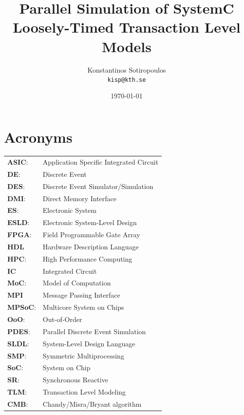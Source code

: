 \documentclass[12pt,twoside]{article}
\author{Konstantinos Sotiropoulos \\ \texttt{kisp@kth.se}}
\date{\today}
\title{Parallel Simulation of SystemC Loosely-Timed Transaction Level Models}
\begin{document}
\maketitle
\clearpage

\tableofcontents
\clearpage



\section{Acronyms}
\label{sec-1}
\begin{center}
\begin{tabular}{ll}
\textbf{ASIC}: & Application Specific Integrated Circuit\\
\textbf{DE}: & Discrete Event\\
\textbf{DES}: & Discrete Event Simulator/Simulation\\
\textbf{DMI}: & Direct Memory Interface\\
\textbf{ES}: & Electronic System\\
\textbf{ESLD}: & Electronic System-Level Design\\
\textbf{FPGA}: & Field Programmable Gate Array\\
\textbf{HDL} & Hardware Description Language\\
\textbf{HPC}: & High Performance Computing\\
\textbf{IC} & Integrated Circuit\\
\textbf{MoC}: & Model of Computation\\
\textbf{MPI} & Message Passing Interface\\
\textbf{MPSoC}: & Multicore System on Chips\\
\textbf{OoO}: & Out-of-Order\\
\textbf{PDES}: & Parallel Discrete Event Simulation\\
\textbf{SLDL}: & System-Level Design Language\\
\textbf{SMP}: & Symmetric Multiprocessing\\
\textbf{SoC}: & System on Chip\\
\textbf{SR}: & Synchronous Reactive\\
\textbf{TLM}: & Transaction Level Modeling\\
\textbf{CMB}: & Chandy/Misra/Bryant algorithm\\
\end{tabular}
\end{center}
\clearpage
\end{document}

